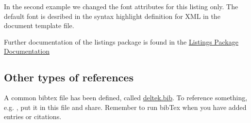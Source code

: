 \lstset{language=XML,
	   includerangemarker=false,
	   rangebeginprefix=<,
	   rangeendprefix=</,
	   rangesuffix=>}
	   


In the second example we changed the font attributes for this listing only. The default font is desribed in the syntax highlight definition for XML in the document template file. 

Further documentation of the listings package is found in the \href{http://mirror.jmu.edu/pub/CTAN/macros/latex/contrib/listings/listings.pdf}{Listings Package Documentation}

\subsection{Other types of references}
A common bibtex file has been defined, called \href{run:/deltek.bib}{deltek.bib}. To reference something, e.g. \cite{cleancode}, put it in this file and share. Remember to run bibTex when you have added entries or citations.

